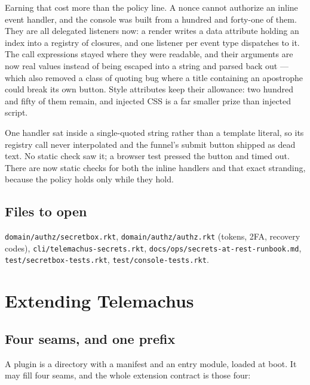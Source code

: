 \documentclass[11pt,a4paper]{report}
\gdef\currentchapterart{art/telemachus-head.png}
\newcommand{\chapterart}[1]{\gdef\currentchapterart{#1}}
\newcommand{\chapterart}[1]{}
\begin{document}
Earning that cost more than the policy line. A nonce cannot authorize an inline event handler, and the console was built from a hundred and forty-one of them. They are all delegated listeners now: a render writes a data attribute holding an index into a registry of closures, and one listener per event type dispatches to it. The call expressions stayed where they were readable, and their arguments are now real values instead of being escaped into a string and parsed back out --- which also removed a class of quoting bug where a title containing an apostrophe could break its own button. Style attributes keep their allowance: two hundred and fifty of them remain, and injected CSS is a far smaller prize than injected script.

One handler sat inside a single-quoted string rather than a template literal, so its registry call never interpolated and the funnel's submit button shipped as dead text. No static check saw it; a browser test pressed the button and timed out. There are now static checks for both the inline handlers and that exact stranding, because the policy holds only while they hold.

\section{Files to open}

\texttt{domain/authz/secretbox.rkt}, \texttt{domain/authz/authz.rkt} (tokens, 2FA, recovery codes), \texttt{cli/telemachus-secrets.rkt}, \texttt{docs/ops/secrets-at-rest-runbook.md}, \texttt{test/secretbox-tests.rkt}, \texttt{test/console-tests.rkt}.

\chapterart{art/ch-15-extending.png}
\chapter{Extending Telemachus}

\section{Four seams, and one prefix}

A plugin is a directory with a manifest and an entry module, loaded at boot. It may fill four seams, and the whole extension contract is those four:
\end{document}
